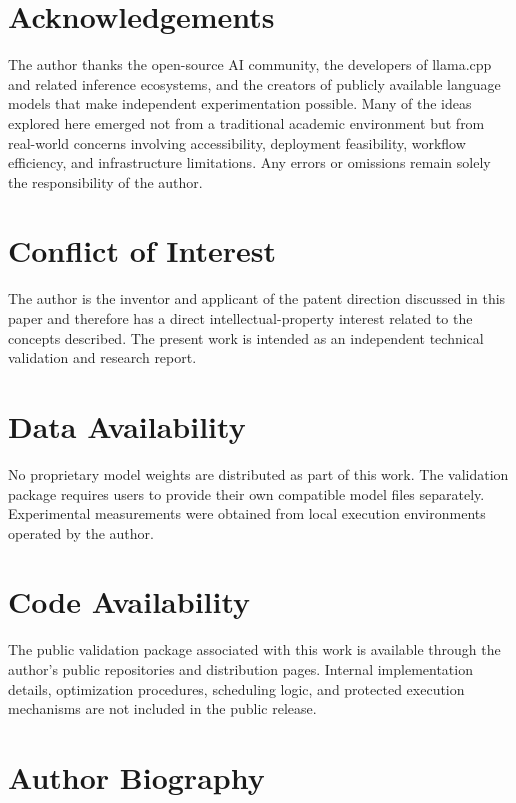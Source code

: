 \documentclass[11pt]{article}
\begin{document}
\section*{Acknowledgements}

The author thanks the open-source AI community, the developers of llama.cpp and related inference ecosystems, and the creators of publicly available language models that make independent experimentation possible. Many of the ideas explored here emerged not from a traditional academic environment but from real-world concerns involving accessibility, deployment feasibility, workflow efficiency, and infrastructure limitations. Any errors or omissions remain solely the responsibility of the author.

\section*{Conflict of Interest}

The author is the inventor and applicant of the patent direction discussed in this paper and therefore has a direct intellectual-property interest related to the concepts described. The present work is intended as an independent technical validation and research report.

\section*{Data Availability}

No proprietary model weights are distributed as part of this work. The validation package requires users to provide their own compatible model files separately. Experimental measurements were obtained from local execution environments operated by the author.

\section*{Code Availability}

The public validation package associated with this work is available through the author's public repositories and distribution pages. Internal implementation details, optimization procedures, scheduling logic, and protected execution mechanisms are not included in the public release.

\section*{Author Biography}
\end{document}
